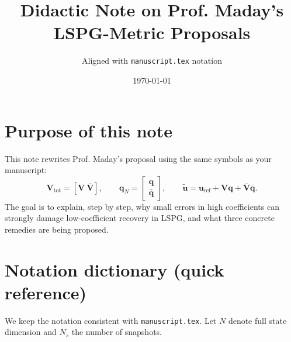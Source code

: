 \documentclass[11pt]{article}
\title{Didactic Note on Prof. Maday's LSPG-Metric Proposals}
\author{Aligned with \texttt{manuscript.tex} notation}
\date{\today}
\begin{document}
\maketitle

\section{Purpose of this note}
This note rewrites Prof. Maday's proposal using the same symbols as your manuscript:
\[
\mathbf V_{\mathrm{tot}}=[\mathbf V\ \overline{\mathbf V}],
\qquad
\mathbf q_N=
\begin{bmatrix}
\mathbf q\\
\bar{\mathbf q}
\end{bmatrix},
\qquad
\tilde{\mathbf u}=\mathbf u_{\mathrm{ref}}+\mathbf V\mathbf q+\overline{\mathbf V}\bar{\mathbf q}.
\]
The goal is to explain, step by step, why small errors in high coefficients can strongly damage low-coefficient recovery in LSPG, and what three concrete remedies are being proposed.

\section{Notation dictionary (quick reference)}
We keep the notation consistent with \texttt{manuscript.tex}. Let $N$ denote full state dimension and $N_s$ the number of snapshots.
\end{document}
